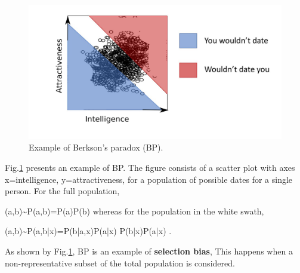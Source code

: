 \begin{figure}[h!]
\centering
\includegraphics[width=5in]
{berkson/berkson.png}
\caption{
Example
of Berkson's paradox (BP).} 
\label{fig-berkson}
\end{figure}


Fig.\ref{fig-berkson}
presents an example
of BP. The
figure consists of
a scatter plot
with axes x=intelligence,
y=attractiveness, 
for a population of 
possible dates for a single person. 
For the full population,

\beq
(a,b)\sim P(a,b)=P(a)P(b)
\eeq
whereas for the population
in the white swath,

\beq
(a,b)\sim P(a,b|x)=P(b|a,x)P(a|x)\neq
P(b|x)P(a|x)
\;.
\eeq

As shown by
Fig.\ref{fig-berkson},
 BP is an example of {\bf selection bias},
This happens when
a non-representative
subset of the total population
is considered.


